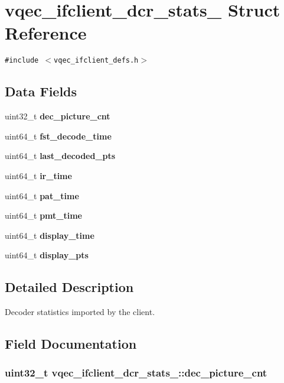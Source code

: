 \section{vqec\_\-ifclient\_\-dcr\_\-stats\_\- Struct Reference}
\label{structvqec__ifclient__dcr__stats__}
{\tt \#include $<$vqec\_\-ifclient\_\-defs.h$>$}

\subsection*{Data Fields}
\begin{CompactItemize}
\item 
uint32\_\-t \bf{dec\_\-picture\_\-cnt}
\item 
uint64\_\-t \bf{fst\_\-decode\_\-time}
\item 
uint64\_\-t \bf{last\_\-decoded\_\-pts}
\item 
uint64\_\-t \bf{ir\_\-time}
\item 
uint64\_\-t \bf{pat\_\-time}
\item 
uint64\_\-t \bf{pmt\_\-time}
\item 
uint64\_\-t \bf{display\_\-time}
\item 
uint64\_\-t \bf{display\_\-pts}
\end{CompactItemize}


\subsection{Detailed Description}
Decoder statistics imported by the client. 



\subsection{Field Documentation}
\subsubsection{\setlength{\rightskip}{0pt plus 5cm}uint32\_\-t \bf{vqec\_\-ifclient\_\-dcr\_\-stats\_\-::dec\_\-picture\_\-cnt}}\label{structvqec__ifclient__dcr__stats___ca49aaa511d581116dab0fd5ba78cb4b}


